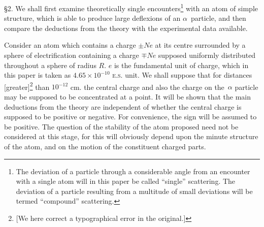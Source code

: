 \smallskip

\S2. We shall first examine theoretically single encounters\footnote{The
  deviation of a particle through a considerable angle from an encounter
  with a single atom will in this paper be called ``single'' scattering.
  The deviation of a particle resulting from a multitude of small
  deviations will be termed ``compound'' scattering.} with an atom of
simple structure, which is able to produce large deflexions of an
$\alpha$~particle, and then compare the deductions from the theory with
the experimental data available.

Consider an atom which contains a charge $\pm Ne$ at its centre
surrounded by a sphere of electrification containing a charge $\mp Ne$
supposed uniformly distributed throughout a sphere of radius $R$.
$e$ is the fundamental unit of charge, which in this paper is taken
as $4.65 \times  10^{-10}$ \textsc{e.s.} unit. We shall suppose that for distances
{[}greater{]}\footnote{{[}We here correct a typographical error in the
  original.{]}} than $10^{-12}$ cm. the central charge and also the charge on
the~$\alpha$ particle may be supposed to be concentrated at a point. It
will be shown that the main deductions from the theory are independent
of whether the central charge is supposed to be positive or negative.
For convenience, the sign will be assumed to be positive. The question
of the stability of the atom proposed need not be considered at this
stage, for this will obviously depend upon the minute structure of the
atom, and on the motion of the constituent charged parts.


